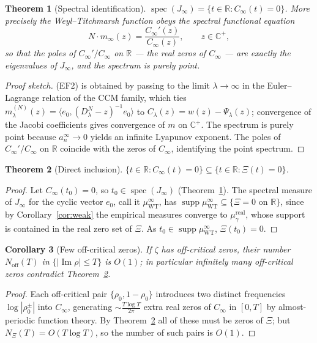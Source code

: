 \documentclass[11pt]{amsart}
\newtheorem{theorem}{Theorem}[section]
\newtheorem{corollary}[theorem]{Corollary}
\theoremstyle{definition}
\theoremstyle{remark}
\renewcommand{\Im}{\operatorname{Im}}
\newcommand{\Cinf}{C_\infty}
\newcommand{\Clam}{C_\lambda}
\newcommand{\Jinf}{J_\infty}
\DeclareMathOperator{\spec}{spec}
\DeclareMathOperator{\supp}{supp}
\begin{document}
\begin{theorem}[Spectral identification]\label{thm:C}
$\spec(\Jinf)=\{t\in\mathbb R:\Cinf(t)=0\}$. More precisely the Weyl--Titchmarsh function
obeys the spectral functional equation
\[
N\cdot m_\infty(z)=\frac{\Cinf'(z)}{\Cinf(z)},\qquad z\in\mathbb C^+,
\tag{EF2}
\]
so that the poles of $\Cinf'/\Cinf$ on $\mathbb R$ --- the real zeros of $\Cinf$ --- are exactly
the eigenvalues of $\Jinf$, and the spectrum is purely point.
\end{theorem}
\begin{proof}[Proof sketch]
(EF2) is obtained by passing to the limit $\lambda\to\infty$ in the Euler--Lagrange relation
of the CCM family, which ties $m_\lambda^{(N)}(z)=\langle e_0,(D_\lambda^N-z)^{-1}e_0\rangle$
to $\Clam(z)=w(z)-\Psi_\lambda(z)$; convergence of the Jacobi coefficients gives convergence
of $m$ on $\mathbb C^+$. The spectrum is purely point because $a_n^\infty\to0$ yields an
infinite Lyapunov exponent. The poles of $\Cinf'/\Cinf$ on $\mathbb R$ coincide with the zeros
of $\Cinf$, identifying the point spectrum.
\end{proof}

\begin{theorem}[Direct inclusion]\label{thm:B}
$\{t\in\mathbb R:\Cinf(t)=0\}\subseteq\{t\in\mathbb R:\Xi(t)=0\}$.
\end{theorem}
\begin{proof}
Let $\Cinf(t_0)=0$, so $t_0\in\spec(\Jinf)$ (Theorem~\ref{thm:C}). The spectral measure of
$\Jinf$ for the cyclic vector $e_0$, call it $\mu_{\mathrm{WT}}^\infty$, has
$\supp\mu_{\mathrm{WT}}^\infty\subseteq\{\Xi=0\text{ on }\mathbb R\}$, since by
Corollary~\ref{cor:weak} the empirical measures converge to $\mu_\gamma^{\mathrm{real}}$,
whose support is contained in the real zero set of $\Xi$. As $t_0\in\supp
\mu_{\mathrm{WT}}^\infty$, $\Xi(t_0)=0$.
\end{proof}

\begin{corollary}[Few off-critical zeros]\label{cor:few}
If $\zeta$ has off-critical zeros, their number $N_{\mathrm{off}}(T)$ in $\{|\Im\rho|\le T\}$
is $O(1)$; in particular infinitely many off-critical zeros contradict Theorem~\ref{thm:B}.
\end{corollary}
\begin{proof}
Each off-critical pair $\{\rho_0,1-\rho_0\}$ introduces two distinct frequencies
$\log|\rho_0^\pm|$ into $\Cinf$, generating $\sim\frac{T\log T}{2\pi}$ extra real zeros of
$\Cinf$ in $[0,T]$ by almost-periodic function theory. By Theorem~\ref{thm:B} all of these
must be zeros of $\Xi$; but $N_\Xi(T)=O(T\log T)$, so the number of such pairs is $O(1)$.
\end{proof}
\end{document}
